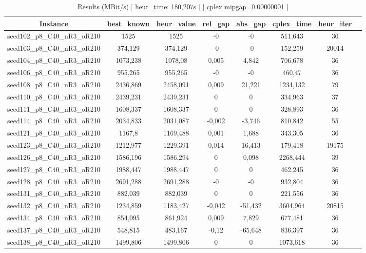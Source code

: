\documentclass[a4paper]{article}
\begin{document}
\begin{center}
\begin{longtable}{cccccccc}
\caption{Results (MBit/s) [ heur\_time: 180,207s ]  [ cplex mipgap=0.00000001 ]}
\tabularnewline
\hline
Instance & best\_known & heur\_value & rel\_gap & abs\_gap & cplex\_time & heur\_iter\\
\hline
seed102\_p8\_C40\_nR3\_oR210 & 1525 & 1525 & -0 & -0 & 511,643 & 36\\
\hline
seed103\_p8\_C40\_nR3\_oR210 & 374,129 & 374,129 & -0 & -0 & 152,259 & 20014\\
\hline
seed104\_p8\_C40\_nR3\_oR210 & 1073,238 & 1078,08 & 0,005 & 4,842 & 706,678 & 36\\
\hline
seed106\_p8\_C40\_nR3\_oR210 & 955,265 & 955,265 & -0 & -0 & 460,47 & 36\\
\hline
seed108\_p8\_C40\_nR3\_oR210 & 2436,869 & 2458,091 & 0,009 & 21,221 & 1234,132 & 79\\
\hline
seed110\_p8\_C40\_nR3\_oR210 & 2439,231 & 2439,231 & 0 & 0 & 334,963 & 37\\
\hline
seed111\_p8\_C40\_nR3\_oR210 & 1608,337 & 1608,337 & 0 & 0 & 328,893 & 36\\
\hline
seed114\_p8\_C40\_nR3\_oR210 & 2034,833 & 2031,087 & -0,002 & -3,746 & 810,842 & 55\\
\hline
seed121\_p8\_C40\_nR3\_oR210 & 1167,8 & 1169,488 & 0,001 & 1,688 & 343,305 & 36\\
\hline
seed123\_p8\_C40\_nR3\_oR210 & 1212,977 & 1229,391 & 0,014 & 16,413 & 179,418 & 19175\\
\hline
seed126\_p8\_C40\_nR3\_oR210 & 1586,196 & 1586,294 & 0 & 0,098 & 2268,444 & 39\\
\hline
seed127\_p8\_C40\_nR3\_oR210 & 1988,447 & 1988,447 & 0 & 0 & 462,245 & 36\\
\hline
seed128\_p8\_C40\_nR3\_oR210 & 2691,288 & 2691,288 & -0 & -0 & 932,804 & 36\\
\hline
seed131\_p8\_C40\_nR3\_oR210 & 882,039 & 882,039 & 0 & 0 & 221,556 & 36\\
\hline
seed132\_p8\_C40\_nR3\_oR210 & 1234,859 & 1183,427 & -0,042 & -51,432 & 3604,964 & 20815\\
\hline
seed134\_p8\_C40\_nR3\_oR210 & 854,095 & 861,924 & 0,009 & 7,829 & 677,481 & 36\\
\hline
seed137\_p8\_C40\_nR3\_oR210 & 548,815 & 483,167 & -0,12 & -65,648 & 836,397 & 36\\
\hline
seed138\_p8\_C40\_nR3\_oR210 & 1499,806 & 1499,806 & 0 & 0 & 1073,618 & 36\\

\end{longtable}
\end{center}
\end{document}
